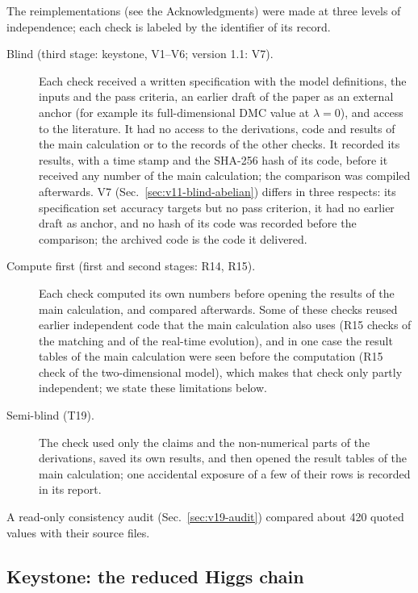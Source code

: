 The reimplementations (see the Acknowledgments) were made at three levels of independence; each check is labeled by the identifier of its record.
\begin{description}
\item[Blind (third stage: keystone, V1--V6; version 1.1: V7).] Each check received a written specification with the model definitions, the inputs and the pass criteria, an earlier draft of the paper as an external anchor (for example its full-dimensional DMC value at $\lambda=0$), and access to the literature.
It had no access to the derivations, code and results of the main calculation or to the records of the other checks.
It recorded its results, with a time stamp and the SHA-256 hash of its code, before it received any number of the main calculation; the comparison was compiled afterwards.
V7 (Sec.~\ref{sec:v11-blind-abelian}) differs in three respects: its specification set accuracy targets but no pass criterion, it had no earlier draft as anchor, and no hash of its code was recorded before the comparison; the archived code is the code it delivered.
\item[Compute first (first and second stages: R14, R15).] Each check computed its own numbers before opening the results of the main calculation, and compared afterwards.
Some of these checks reused earlier independent code that the main calculation also uses (R15 checks of the matching and of the real-time evolution), and in one case the result tables of the main calculation were seen before the computation (R15 check of the two-dimensional model), which makes that check only partly independent; we state these limitations below.
\item[Semi-blind (T19).] The check used only the claims and the non-numerical parts of the derivations, saved its own results, and then opened the result tables of the main calculation; one accidental exposure of a few of their rows is recorded in its report.
\end{description}
A read-only consistency audit (Sec.~\ref{sec:v19-audit}) compared about 420 quoted values with their source files.

\subsection{Keystone: the reduced Higgs chain}\label{sec:v19-keystone}

